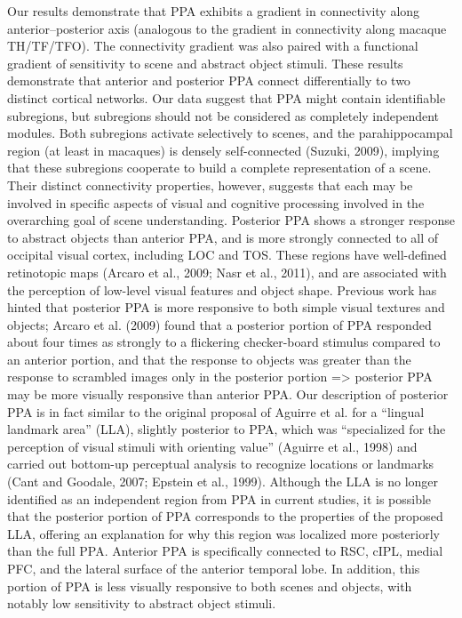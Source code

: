 \documentclass[english]{article}
\begin{document}
Our results demonstrate that PPA exhibits a gradient in connectivity along
anterior–posterior axis (analogous to the gradient in connectivity along macaque
TH/TF/TFO). The connectivity gradient was also paired with a functional gradient
of sensitivity to scene and abstract object stimuli. These results demonstrate
that anterior and posterior PPA connect differentially to two distinct cortical
networks.
Our data suggest that PPA might contain identifiable subregions, but subregions
should not be considered as completely independent modules. Both subregions
activate selectively to scenes, and the parahippocampal region (at least in
macaques) is densely self-connected (Suzuki, 2009), implying that these
subregions cooperate to build a complete representation of a scene.  Their
distinct connectivity properties, however, suggests that each may be involved in
specific aspects of visual and cognitive processing involved in the overarching
goal of scene understanding.
Posterior PPA shows a stronger response to abstract objects than anterior PPA,
and is more strongly connected to all of occipital visual cortex, including LOC
and TOS. These regions have well-defined retinotopic maps (Arcaro et al., 2009;
Nasr et al., 2011), and are associated with the perception of low-level visual
features and object shape. Previous work has hinted that posterior PPA is more
responsive to both simple visual textures and objects; Arcaro et al. (2009)
found that a posterior portion of PPA responded about four times as strongly to
a flickering checker-board stimulus compared to an anterior portion, and that
the response to objects was greater than the response to scrambled images only
in the posterior portion => posterior PPA may be more visually responsive than
anterior PPA.
Our description of posterior PPA is in fact similar to the original proposal of
Aguirre et al. for a “lingual landmark area” (LLA), slightly posterior to PPA,
which was “specialized for the perception of visual stimuli with orienting
value” (Aguirre et al., 1998) and carried out bottom-up perceptual analysis to
recognize locations or landmarks (Cant and Goodale, 2007; Epstein et al., 1999).
Although the LLA is no longer identified as an independent region from PPA in
current studies, it is possible that the posterior portion of PPA corresponds to
the properties of the proposed LLA, offering an explanation for why this region
was localized more posteriorly than the full PPA.
Anterior PPA is specifically connected to RSC, cIPL, medial PFC, and the lateral
surface of the anterior temporal lobe. In addition, this portion of PPA is less
visually responsive to both scenes and objects, with notably low sensitivity to
abstract object stimuli.
\end{document}
